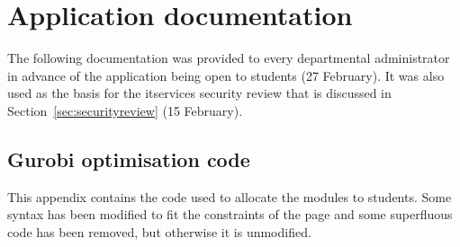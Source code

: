 \documentclass[twoside]{scrartcl}
\let\stdsection\section
\renewcommand\section{\clearpage\stdsection}
\begin{document}
\clearpage

\stdsection{Application documentation}
\label{sec:documentation}

The following documentation was provided to every departmental administrator
in advance of the application being open to students (27 February). It was
also used as the basis for the \gls{itservices} security review that is
discussed in Section~\ref{sec:securityreview} (15 February).




\begin{landscape}
  \stdsection{Gurobi optimisation code}
  \label{sec:gurobicode}
  
  This appendix contains the code used to allocate the modules to students. Some
  syntax has been modified to fit the constraints of the page and some
  superfluous code has been removed, but otherwise it is unmodified.
  
  
\end{landscape}

\clearpage
\printglossaries

\clearpage

\end{document}
